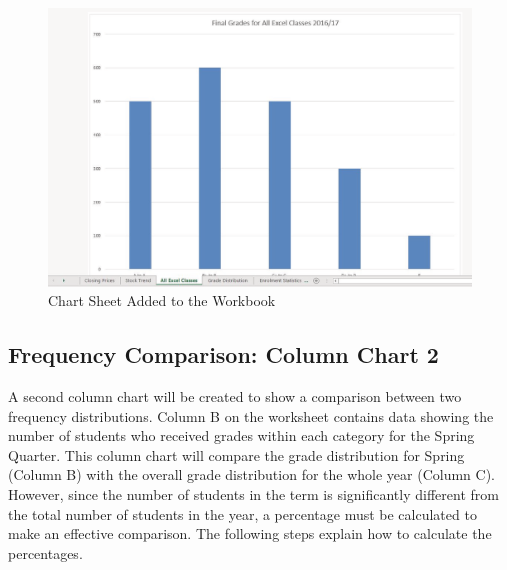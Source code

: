 \begin{figure}[H]
	\centering
	\includegraphics[width=\maxwidth{.95\linewidth}]{gfx/ch04_fig15}
	\caption{Chart Sheet Added to the Workbook}
	\label{04:fig15}
\end{figure}

\subsection{Frequency Comparison: Column Chart 2}

A second column chart will be created to show a comparison between two frequency distributions. Column B on the  worksheet contains data showing the number of students who received grades within each category for the Spring Quarter. This column chart will compare the grade distribution for Spring (Column B) with the overall grade distribution for the whole year (Column C). However, since the number of students in the term is significantly different from the total number of students in the year, a percentage must be calculated to make an effective comparison. The following steps explain how to calculate the percentages.

